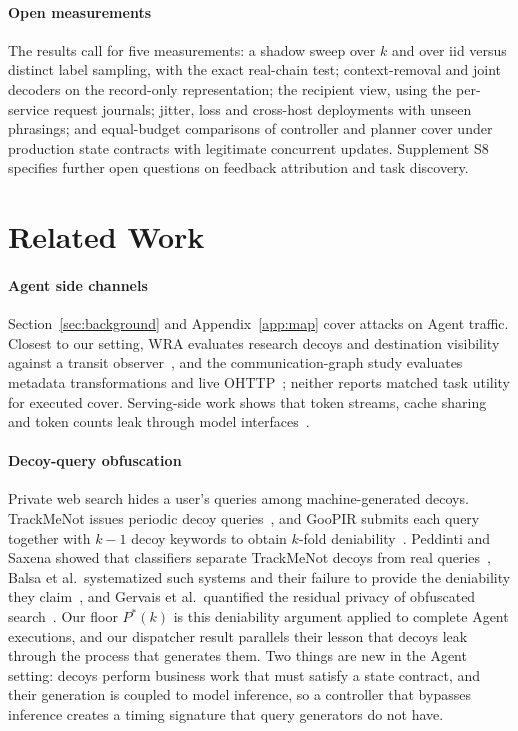\paragraph{Open measurements}
The results call for five measurements: a shadow sweep over $k$ and over iid versus distinct label sampling, with the exact real-chain test; context-removal and joint decoders on the record-only representation; the recipient view, using the per-service request journals; jitter, loss and cross-host deployments with unseen phrasings; and equal-budget comparisons of controller and planner cover under production state contracts with legitimate concurrent updates. Supplement S8 specifies further open questions on feedback attribution and task discovery.

\section{Related Work}\label{sec:related}
\paragraph{Agent side channels}
Section~\ref{sec:background} and Appendix~\ref{app:map} cover attacks on Agent traffic. Closest to our setting, WRA evaluates research decoys and destination visibility against a transit observer~\cite{jeong2026wra}, and the communication-graph study evaluates metadata transformations and live OHTTP~\cite{dangol2026workflow}; neither reports matched task utility for executed cover. Serving-side work shows that token streams, cache sharing and token counts leak through model interfaces~\cite{weiss2024prompt,whisperleak2025,earlybird2025,timewilltell2024,carlini2024timing,wu2026cacheprune}.

\paragraph{Decoy-query obfuscation}
Private web search hides a user's queries among machine-generated decoys. TrackMeNot issues periodic decoy queries~\cite{howe2008trackmenot}, and GooPIR submits each query together with $k-1$ decoy keywords to obtain $k$-fold deniability~\cite{domingoferrer2009goopir}. Peddinti and Saxena showed that classifiers separate TrackMeNot decoys from real queries~\cite{peddinti2010trackmenot}, Balsa et al.\ systematized such systems and their failure to provide the deniability they claim~\cite{balsa2012obpws}, and Gervais et al.\ quantified the residual privacy of obfuscated search~\cite{gervais2014websearch}. Our floor $P^*(k)$ is this deniability argument applied to complete Agent executions, and our dispatcher result parallels their lesson that decoys leak through the process that generates them. Two things are new in the Agent setting: decoys perform business work that must satisfy a state contract, and their generation is coupled to model inference, so a controller that bypasses inference creates a timing signature that query generators do not have.

